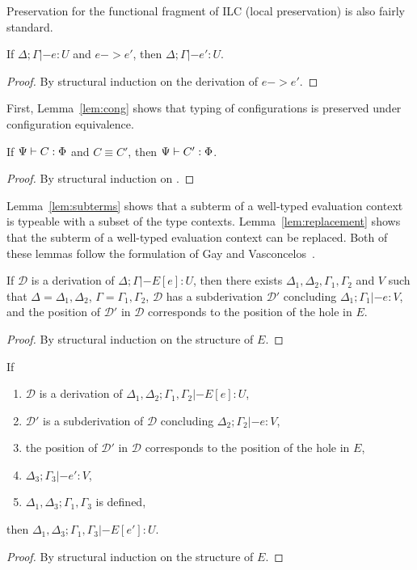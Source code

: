 Preservation for the functional fragment of ILC (local preservation) is also
fairly standard.

\begin{theorem}
  If $\Delta; \Gamma|- e : U$ and $e -> e'$, then $\Delta; \Gamma|- e' : U$.
  \begin{proof}
    By structural induction on the derivation of $e -> e'$.
  \end{proof}
\end{theorem}

First, Lemma~\ref{lem:cong} shows that typing of configurations is preserved
under configuration equivalence.

\begin{lemma}[\todo{}]\label{lem:cong}
  If $\Psi |- C : \Phi$ and $C \equiv C'$, then $\Psi |- C' : \Phi$.
  \begin{proof}
    By structural induction on \todo{}.
  \end{proof}
\end{lemma}

Lemma~\ref{lem:subterms} shows that a subterm of a well-typed evaluation context
is typeable with a subset of the type contexts. Lemma~\ref{lem:replacement}
shows that the subterm of a well-typed evaluation context can be replaced. Both
of these lemmas follow the formulation of Gay and
Vasconcelos~\cite{gay2010linear}.

\begin{lemma}\label{lem:subterms}
  If $\mathcal{D}$ is a derivation of $\Delta; \Gamma |- E[e] : U$, then there exists $\Delta_1, \Delta_2,
  \Gamma_1,\Gamma_2$ and $V$ such that $\Delta = \Delta_1,\Delta_2$, $\Gamma = \Gamma_1,\Gamma_2$, $\mathcal{D}$ has a
  subderivation $\mathcal{D}'$ concluding $\Delta_1;\Gamma_1 |- e : V$, and the position of $\mathcal{D}'$ in
  $\mathcal{D}$ corresponds to the position of the hole in $E$.
  \begin{proof}
    By structural induction on the structure of $E$.
  \end{proof}
\end{lemma}

\begin{lemma}\label{lem:replacement}
  If
  \begin{enumerate}
  \item $\mathcal{D}$ is a derivation of $\Delta_1,\Delta_2;\Gamma_1,\Gamma_2 |- E[e] : U$,
  \item $\mathcal{D}'$ is a subderivation of $\mathcal{D}$ concluding $\Delta_2;
    \Gamma_2 |- e : V$,
  \item the position of $\mathcal{D}'$ in $\mathcal{D}$ corresponds to the
    position of the hole in $E$,
  \item $\Delta_3;\Gamma_3 |- e' : V$,
  \item $\Delta_1,\Delta_3;\Gamma_1,\Gamma_3$ is defined,
  \end{enumerate}
  then $\Delta_1,\Delta_3;\Gamma_1,\Gamma_3 |- E[e'] : U$.
  \begin{proof}
    By structural induction on the structure of $E$.
  \end{proof}  
\end{lemma}

